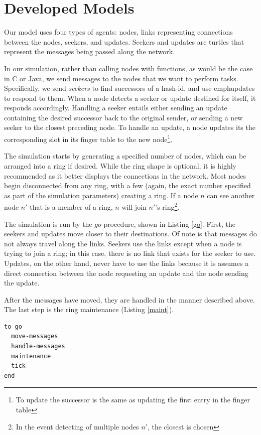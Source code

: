 \documentclass[12pt]{article} %
\begin{document}
\section{Developed Models}

Our model uses four types of agents: nodes, links representing connections between the nodes, seekers, and updates.  Seekers and updates are turtles that represent the messages being passed along the network.

In our simulation, rather than calling nodes with functions, as would be the case in C or Java, we send messages to the nodes that we want to perform tasks. Specifically, we send \emph{seekers} to find successors of a hash-id, and use emph{updates} to respond to them.  When a node detects a seeker or update destined for itself, it responds accordingly.  Handling a seeker entails either sending an update containing the desired successor back to the original sender, or sending a new seeker to the closest preceding node.  To handle an update, a node updates its the corresponding slot in its finger table to the new node\footnote{To update the successor is the same as updating the first entry in the finger table}.


The simulation starts by generating a specified number of nodes, which can be arranged into a ring if desired.  While the ring shape is optional, it is highly recommended as it better displays the connections in the network.  Most nodes begin disconnected from any ring, with a few (again, the exact number specified as part of the simulation parameters) creating a ring.  If a node $n$ can see another node $n'$ that is a member of a ring, $n$ will join  $n'$'s ring\footnote{In the event detecting of multiple nodes $n'$, the closest is chosen}. 

The simulation is run by the $go$ procedure, shown in Listing \ref{go}.  First, the seekers and updates move closer to their destinations.
 Of note is that messages do not always travel along the links.  Seekers use the links except when a node is trying to join a ring;  in this case, there is no link that exists for the seeker to use. Updates, on the other hand, never have to use the links because it is assumes a direct connection between the node requesting an update and the node sending the update.

After the messages have moved, they are handled in the manner described above. The last step is the ring maintenance (Listing \ref{maint}).

\begin{lstlisting}[caption={The topmost procedure of the simulation.},label=go]
to go
  move-messages
  handle-messages
  maintenance
  tick
end
\end{lstlisting}
\end{document}
